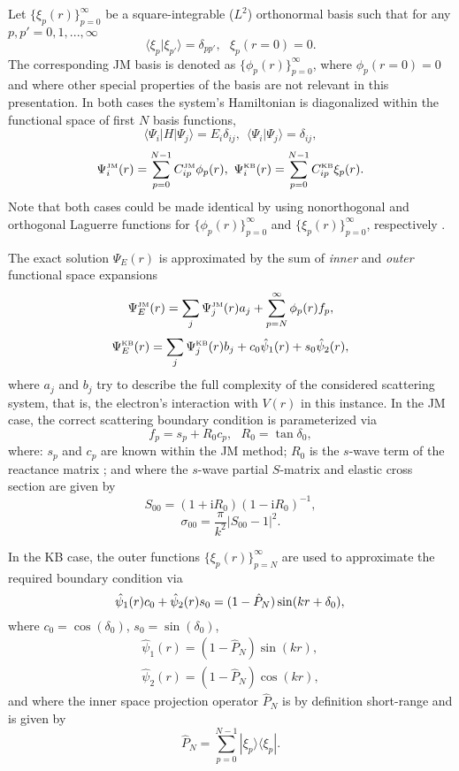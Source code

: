 \documentclass[aip
, pra
, showpacs
, aps
, twocolumn
, groupedaddress
, floatfix
]{revtex4}
\newcommand{\beq}{\begin{equation}}
\newcommand{\eeq}{\end{equation}}
\newcommand{\barr}{\begin{array}}
\newcommand{\earr}{\end{array}}
\newcommand{\JM}{\mbox{\tiny{JM}}}
\newcommand{\KB}{\mbox{\tiny{KB}}}
\begin{document}
Let $\{\xi_p(r)\}_{p=0}^\infty$ be a square-integrable ($L^2$) orthonormal basis
such that
for any $p,p'=0,1,...,\infty$
\beq
\langle \xi_p | \xi_{p'} \rangle=\delta_{pp'}, \ \ \ \xi_p(r=0)=0.
\eeq
The corresponding JM basis is denoted as $\{\phi_p(r)\}_{p=0}^\infty$, where $\phi_p(r=0)=0$
and where other special properties of the basis are not relevant in this presentation.
In both cases the system's Hamiltonian is diagonalized within the functional space of first $N$ basis functions,
\beq
\langle \Psi_i |H| \Psi_j \rangle = E_i \delta_{ij} , \ \ \langle \Psi_i | \Psi_j \rangle=\delta_{ij},
\eeq
\beq
\Psi_i^{\JM}(r) = \sum_{p=0}^{N-1} C_{ip}^{\JM} \phi_p(r), \
\Psi_i^{\KB}(r) = \sum_{p=0}^{N-1} C_{ip}^{\KB} \xi_p(r).
\eeq
Note that both cases could be made identical by using nonorthogonal and orthogonal Laguerre functions for
$\{\phi_p(r)\}_{p=0}^\infty$ and $\{\xi_p(r)\}_{p=0}^\infty$, respectively \cite{KB10p022708}.


The exact solution $\Psi_E(r)$ is approximated by the sum of {\em inner} and {\em outer} functional space expansions
\beq
\Psi_E^{\JM}(r) =\sum_j \Psi_j^{\JM}(r)a_j  + \sum_{p=N}^{\infty} \phi_p(r) f_p,  \label{Psi_JM}
\eeq
\beq
\Psi_E^{\KB}(r) =\sum_j \Psi_j^{\KB}(r) b_j  + c_0 \hat{\psi}_1(r)  + s_0 \hat{\psi}_2(r), \label{Psi_KB}
\eeq
where $a_j$ and $b_j$ try to describe the full complexity of the considered scattering system, that is,
the electron's interaction with  $V(r)$ in this instance.
In the JM case, the correct scattering boundary condition is parameterized via
\beq
f_p = s_p + R_0 c_p, \ \ \ R_0 = \tan \delta_0,  \label{R_0}
\eeq
where: $s_p$ and $c_p$  are known within the JM method; 
$R_0$ is the $s$-wave term of the reactance matrix \cite{Taylor72};
and where the $s$-wave partial $S$-matrix and elastic cross section are given by
\beq
S_{00}=(1+\mbox{i}R_0)(1-\mbox{i}R_0)^{-1},
\eeq
\beq
\sigma_{00}=\frac{\pi}{k^2} |S_{00}-1|^2.
\eeq


In the KB case, the outer functions $\{\xi_p(r)\}_{p=N}^\infty$ are used to approximate the required boundary condition via
\beq
\hat{\psi}_1(r) c_0 + \hat{\psi}_2(r) s_0 =
(1-\hat{P}_N) \sin(kr + \delta_0),\\
\eeq
where $c_0 = \cos(\delta_0)$, $s_0 = \sin(\delta_0)$,
\beq \barr{l}
\hat{\psi}_1(r) = (1-\hat{P}_N) \sin(kr),\\
\hat{\psi}_2(r) = (1-\hat{P}_N) \cos(kr),
\earr \eeq
and where the inner space projection operator $\hat{P}_N$ is by definition short-range and is given by \\
\beq
\hat{P}_N = \sum_{p=0}^{N-1} | \xi_p \rangle \langle \xi_p |.
\eeq
\end{document}
